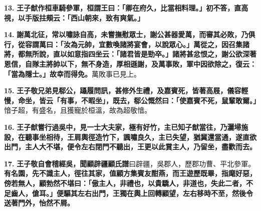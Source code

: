 \textbf{13.} \textbf{王子猷作桓車騎參軍，桓謂王曰：「卿在府久，比當相料理。」初不答，直高視，以手版拄頰云：「西山朝來，致有爽氣。」}

\textbf{14.} \textbf{謝萬北征，常以嘯詠自高，未嘗撫慰眾士，謝公甚器愛萬，而審其必敗，乃俱行，從容謂萬曰：「汝為元帥，宜數喚諸將宴會，以說眾心。」萬從之，因召集諸將，都無所說，直以如意指四坐云：「諸君皆是勁卒。」諸將甚忿恨之，謝公欲深著恩信，自隊主將帥以下，無不身造，厚相遜謝，及萬事敗，軍中因欲除之，復云：「當為隱士。」故幸而得免。}{\footnotesize 萬敗事已見上。}

\textbf{15.} \textbf{王子敬兄弟見郗公，躡履問訊，甚修外生禮，及嘉賓死，皆著高屐，儀容輕慢，命坐，皆云「有事，不暇坐」，既去，郗公慨然曰：「使嘉賓不死，鼠輩敢爾。」}{\footnotesize 愔子超，有盛名，且獲寵於桓溫，故為超敬愔。}

\textbf{16.} \textbf{王子猷嘗行過吳中，見一士大夫家，極有好竹，主已知子猷當往，乃灑埽施設，在聽事坐相待，王肩輿徑造竹下，諷嘯良久，主已失望，猶冀還當通，遂直欲出門，主人大不堪，便令左右閉門不聽出，王更以此賞主人，乃留坐，盡歡而去。}

\textbf{17.} \textbf{王子敬自會稽經吳，聞顧辟疆}{\footnotesize \textbf{顧氏譜}曰辟疆，吳郡人，歷郡功曹、平北參軍。}\textbf{有名園，先不識主人，徑往其家，值顧方集賓友酣燕，而王遊歷既畢，指麾好惡，傍若無人，顧勃然不堪曰：「傲主人，非禮也，以貴驕人，非道也，失此二者，不足齒人，傖耳。」便驅其左右出門，王獨在輿上回轉顧望，左右移時不至，然後令送著門外，怡然不屑。}